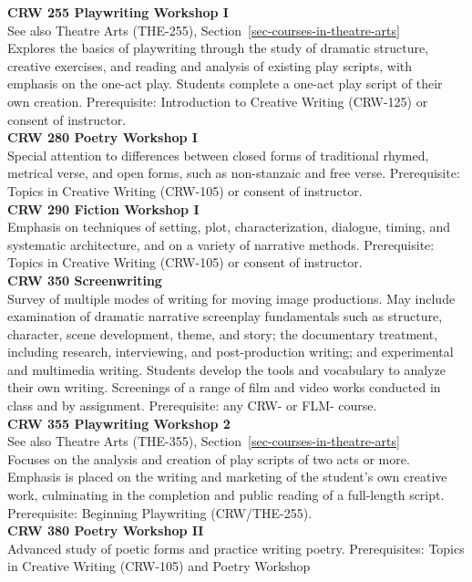 \documentclass[
  letterpaper,
]{scrbook}
\begin{document}
\textbf{CRW 255 Playwriting Workshop I}\\
See also Theatre Arts (THE-255),
Section~\ref{sec-courses-in-theatre-arts}\\
Explores the basics of playwriting through the study of dramatic
structure, creative exercises, and reading and analysis of existing play
scripts, with emphasis on the one-act play. Students complete a one-act
play script of their own creation. Prerequisite: Introduction to
Creative Writing (CRW-125) or consent of instructor.\\
\textbf{CRW 280 Poetry Workshop I}\\
Special attention to differences between closed forms of traditional
rhymed, metrical verse, and open forms, such as non-stanzaic and free
verse. Prerequisite: Topics in Creative Writing (CRW-105) or consent of
instructor.\\
\textbf{CRW 290 Fiction Workshop I}\\
Emphasis on techniques of setting, plot, characterization, dialogue,
timing, and systematic architecture, and on a variety of narrative
methods. Prerequisite: Topics in Creative Writing (CRW-105) or consent
of instructor.\\
\textbf{CRW 350 Screenwriting}\\
Survey of multiple modes of writing for moving image productions. May
include examination of dramatic narrative screenplay fundamentals such
as structure, character, scene development, theme, and story; the
documentary treatment, including research, interviewing, and
post-production writing; and experimental and multimedia writing.
Students develop the tools and vocabulary to analyze their own writing.
Screenings of a range of film and video works conducted in class and by
assignment. Prerequisite: any CRW- or FLM- course.\\
\textbf{CRW 355 Playwriting Workshop 2}\\
See also Theatre Arts (THE-355),
Section~\ref{sec-courses-in-theatre-arts}\\
Focuses on the analysis and creation of play scripts of two acts or
more. Emphasis is placed on the writing and marketing of the student's
own creative work, culminating in the completion and public reading of a
full-length script. Prerequisite: Beginning Playwriting (CRW/THE-255).\\
\textbf{CRW 380 Poetry Workshop II}\\
Advanced study of poetic forms and practice writing poetry.
Prerequisites: Topics in Creative Writing (CRW-105) and Poetry Workshop
\end{document}
